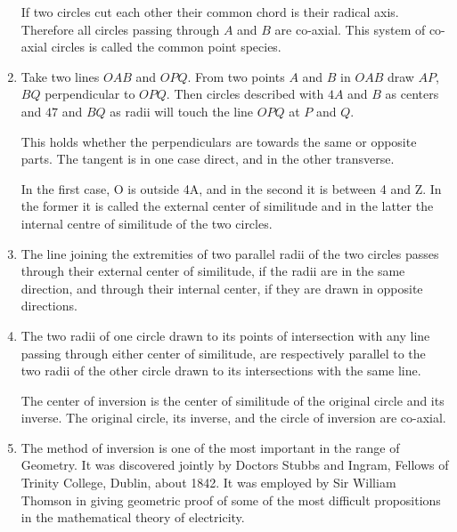 \begin{enumerate}
    If two circles cut each other their common chord is their radical axis.
    Therefore all circles passing through $A$ and $B$ are co-axial. This system
    of co-axial circles is called the common point species.


\item Take two lines $OAB$ and $OPQ$.  From two points $A$ and $B$ in $OAB$ draw
    $AP$, $BQ$ perpendicular to $OPQ$.  Then circles described with $4A$ and $B$
    as centers and $47$ and $BQ$ as radii will touch the line $OPQ$ at $P$ and
    $Q$.


    This holds whether the perpendiculars are towards the same or opposite
    parts.  The tangent is in one case direct, and in the other transverse.

    In the first case, O is outside 4A, and in the second it is between 4 and Z.
    In the former it is called the external center of similitude and in the
    latter the internal centre of similitude of the two circles.


\item The line joining the extremities of two parallel radii of the two circles
    passes through their external center of similitude, if the radii are in the
    same direction, and through their internal center, if they are drawn in
    opposite directions.


\item The two radii of one circle drawn to its points of intersection with any
    line passing through either center of similitude, are respectively parallel
    to the two radii of the other circle drawn to its intersections with the
    same line.

%
%
%
%
%
%
%
%

    The center of inversion is the center of similitude of the original circle
    and its inverse.  The original circle, its inverse, and the circle of
    inversion are co-axial.


\item The method of inversion is one of the most important in the range of
    Geometry.  It was discovered jointly by Doctors Stubbs and Ingram, Fellows
    of Trinity College, Dublin, about 1842.  It was employed by Sir William
    Thomson in giving geometric proof of some of the most difficult propositions
    in the mathematical theory of electricity.



\end{enumerate}
